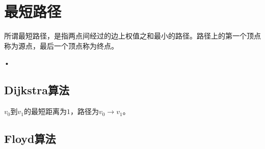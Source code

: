 \section{最短路径}
\begin{frame}\ft{\secname}
\begin{dingyi}
所谓最短路径，是指两点间经过的边上权值之和最小的路径。路径上的第一个顶点称为源点，最后一个顶点称为终点。
\end{dingyi}
\end{frame}

\begin{frame}\ft{\secname}
\begin{figure}
\centering

\end{figure}•

\end{frame}


\subsection{\tf Dijkstra算法}
\begin{frame}\ft{\subsecname}
\begin{figure}
\centering

\end{figure}

$v_0$到$v_1$的最短距离为$1$，路径为$v_0\to v_1$。
\end{frame}



\begin{frame}\ft{\subsecname}

\end{frame}

\begin{frame}\ft{\subsecname}

\end{frame}

\begin{frame}\ft{\subsecname}

\end{frame}

\begin{frame}\ft{\subsecname}

\end{frame}


\subsection{\tf Floyd算法}

\begin{frame}\ft{\subsecname}

\end{frame}

\begin{frame}\ft{\subsecname}

\end{frame}

\begin{frame}\ft{\subsecname}

\end{frame}

\begin{frame}\ft{\subsecname}

\end{frame}